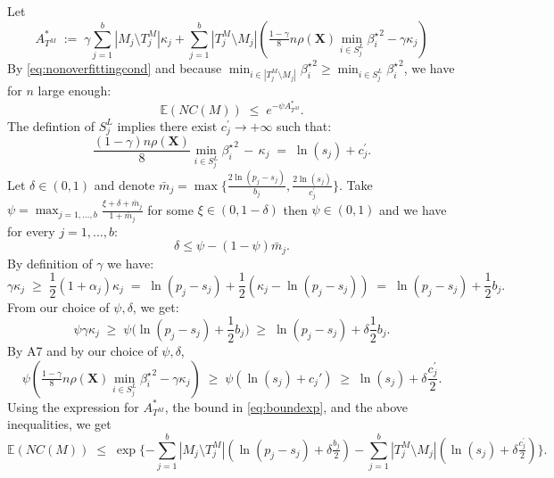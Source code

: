 \documentclass[aos]{imsart}
\theoremstyle{plain}
\newcommand{\E}{\mathbb{E}}
\newcommand{\bs}{\boldsymbol}
\begin{document}
\begin{supplement}
Let 
$$A_{T^M}^*\;:=\;\gamma\sum_{j=1}^b|M_j \setminus T^M_j|\kappa_j + \sum_{j=1}^b |T^M_j\setminus M_j |\left(\tfrac{1-\gamma}{8} n \rho(\bs X) \min_{i\in S^L_j}{\beta^{\star}_i}^{2} - \gamma\kappa_j\right) $$
By \eqref{eq:nonoverfittingcond} and because $\min_{i\in |T^M_j\setminus M_j|}{\beta^{\star}_i}^{2}\geq \min_{i\in S^L_j}{\beta^{\star}_i}^{2}$, we have for $n$ large enough:
\begin{equation}\label{eq:boundexp}
    \E(NC(M))\;\leq\;e^{-\psi A_{T^M}^*}.
\end{equation}
The defintion of $S^L_j$ implies there exist $c^{\prime}_j \to +\infty$ such that:
$$\frac{(1-\gamma) n\rho(\bs X)}{8}\min_{i\in S^L_j}{\beta^{\star}_i}^{2}\,- \,\kappa_j \;=\; \ln(s_j) + c^{\prime}_{j}.$$
Let $\delta \in (0,1)$ and denote $\bar{m}_j=\max\big\{\frac{2\ln(p_j-s_j)}{b_{j}},\frac{2\ln(s_j)}{c^{\prime}_{j}}\big\}$. Take $\psi=\max_{j=1,\ldots,b}\frac{\xi + \delta + \bar{m}_j}{1+\bar{m}_j}$ for some $\xi \in(0, 1- \delta)$ then $\psi \in (0,1)$ and we have for every $j=1,\ldots,b$:
$$\delta \leq \psi-(1-\psi)\bar{m}_j.$$ 
By definition of $\gamma$ we have: 
$$
\gamma\kappa_j\;\geq\;\frac12 (1+\alpha_j)\kappa_j\;=\;\ln(p_j-s_j)+\frac12(\kappa_j-\ln(p_j-s_j)) \;=\; \ln(p_j-s_j)+ \frac12b_{j}.
$$
From our choice of $\psi,\delta$, we get:
$$\psi\gamma\kappa_j \;\geq\; \psi\big(\ln(p_j-s_j)+ \frac12b_{j}\big) \;\geq\;  \ln(p_j-s_j)+ \delta\frac12b_{j}.$$
By A7 and by our choice of $\psi,\delta$,
$$\psi\left(\tfrac{1-\gamma}{8} n \rho(\bs X) \min_{i\in S^L_j}{\beta^{\star}_i}^{2} - \gamma\kappa_j\right) \;\geq\; \psi\left(\ln(s_j)+c_j'\right) \;\geq\; \ln(s_j)+\delta \frac{c^{\prime}_j}{2}.
$$
Using the expression for $A_{T^M}^*$, the bound in \eqref{eq:boundexp}, and the above inequalities, we get
$$
\E(NC(M))\;\leq\;\exp\{- \sum_{j=1}^b |M_j\setminus T^M_j|(\ln(p_j-s_j)+\delta \tfrac{b_j}{2})-\sum_{j=1}^b |T^M_j\setminus M_j|(\ln(s_j)+\delta \tfrac{c^{\prime}_j}{2})\}.
$$


\end{supplement}
\end{document}
